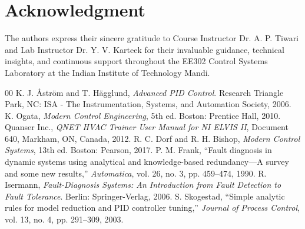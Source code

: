 \documentclass[conference]{IEEEtran}
\begin{document}
\section*{Acknowledgment}
The authors express their sincere gratitude to Course Instructor Dr. A. P. Tiwari and Lab Instructor Dr. Y. V. Karteek for their invaluable guidance, technical insights, and continuous support throughout the EE302 Control Systems Laboratory at the Indian Institute of Technology Mandi.

\begin{thebibliography}{00}
 K. J. \AA str\"om and T. H\"agglund, \textit{Advanced PID Control}. Research Triangle Park, NC: ISA - The Instrumentation, Systems, and Automation Society, 2006.
 K. Ogata, \textit{Modern Control Engineering}, 5th ed. Boston: Prentice Hall, 2010.
 Quanser Inc., \textit{QNET HVAC Trainer User Manual for NI ELVIS II}, Document 640, Markham, ON, Canada, 2012.
 R. C. Dorf and R. H. Bishop, \textit{Modern Control Systems}, 13th ed. Boston: Pearson, 2017.
 P. M. Frank, ``Fault diagnosis in dynamic systems using analytical and knowledge-based redundancy---A survey and some new results,'' \textit{Automatica}, vol. 26, no. 3, pp. 459--474, 1990.
 R. Isermann, \textit{Fault-Diagnosis Systems: An Introduction from Fault Detection to Fault Tolerance}. Berlin: Springer-Verlag, 2006.
 S. Skogestad, ``Simple analytic rules for model reduction and PID controller tuning,'' \textit{Journal of Process Control}, vol. 13, no. 4, pp. 291--309, 2003.
\end{thebibliography}
\end{document}
